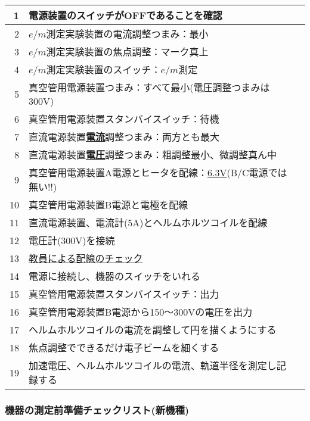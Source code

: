 \begin{tabular}{|r|p{14cm}|p{0.7cm}|}
\hline
1 & 電源装置のスイッチがOFFであることを確認 & \\
\hline
2 & $e/m$測定実験装置の電流調整つまみ：最小 & \\
\hline
3 & $e/m$測定実験装置の焦点調整：マーク真上& \\
\hline
4 & $e/m$測定実験装置のスイッチ：$e/m$測定 & \\
\hline
5 &  真空管用電源装置つまみ：すべて最小(電圧調整つまみは300V) & \\
\hline
6 & 真空管用電源装置スタンバイスイッチ：待機 & \\
\hline
7 & 直流電源装置\underline{\bf 電流}調整つまみ：両方とも最大 & \\
\hline
8 & 直流電源装置\underline{\bf 電圧}調整つまみ：粗調整最小、微調整真ん中 &\\
\hline
9 & 真空管用電源装置A電源とヒータを配線：\underline{6.3V}(B/C電源では無い!!) & \\
\hline
10 & 真空管用電源装置B電源と電極を配線 & \\
\hline
11 & 直流電源装置、電流計(5A)とヘルムホルツコイルを配線 & \\ 
\hline
12 & 電圧計(300V)を接続 & \\
\hline
13 & \underline{教員による配線のチェック} &\\
\hline\hline
14 & 電源に接続し、機器のスイッチをいれる &\\
\hline
15 & 真空管用電源装置スタンバイスイッチ：出力 & \\ 
\hline
16 & 真空管用電源装置B電源から150〜300Vの電圧を出力  & \\
\hline
17 & ヘルムホルツコイルの電流を調整して円を描くようにする  & \\
\hline
18 & 焦点調整でできるだけ電子ビームを細くする  & \\
\hline
19 & 加速電圧、ヘルムホルツコイルの電流、軌道半径を測定し記録する  & \\
\hline
\end{tabular}

\subsubsection*{機器の測定前準備チェックリスト(新機種)}

